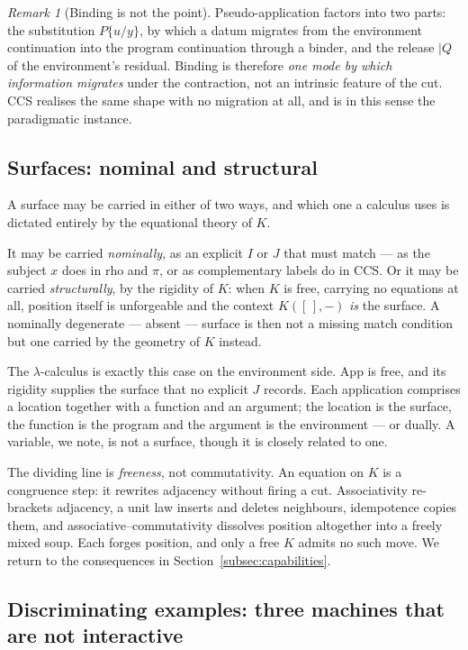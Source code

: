 \documentclass[11pt]{article}
\theoremstyle{definition}
\theoremstyle{plain}
\theoremstyle{remark}
\newtheorem{remark}[definition]{Remark}
\begin{document}
\begin{remark}[Binding is not the point]
Pseudo-application factors into two parts: the substitution $P\{u/y\}$, by which a
datum migrates from the environment continuation into the program continuation through
a binder, and the release $\mid Q$ of the environment's residual. Binding is therefore
\emph{one mode by which information migrates} under the contraction, not an intrinsic
feature of the cut. CCS realises the same shape with no migration at all, and is in this
sense the paradigmatic instance.
\end{remark}

\subsection{Surfaces: nominal and structural}
\label{subsec:surfaces}

A surface may be carried in either of two ways, and which one a calculus uses is
dictated entirely by the equational theory of $K$.

It may be carried \emph{nominally}, as an explicit $I$ or $J$ that must match --- as the
subject $x$ does in rho and $\pi$, or as complementary labels do in CCS. Or it may be
carried \emph{structurally}, by the rigidity of $K$: when $K$ is free, carrying no
equations at all, position itself is unforgeable and the context $K([\,],-)$ \emph{is}
the surface. A nominally degenerate --- absent --- surface is then not a missing match
condition but one carried by the geometry of $K$ instead.

The $\lambda$-calculus is exactly this case on the environment side. $\mathrm{App}$ is
free, and its rigidity supplies the surface that no explicit $J$ records. Each
application comprises a location together with a function and an argument; the location
is the surface, the function is the program and the argument is the environment --- or
dually. A variable, we note, is not a surface, though it is closely related to one.

The dividing line is \emph{freeness}, not commutativity. An equation on $K$ is a
congruence step: it rewrites adjacency without firing a cut. Associativity re-brackets
adjacency, a unit law inserts and deletes neighbours, idempotence copies them, and
associative--commutativity dissolves position altogether into a freely mixed soup. Each
forges position, and only a free $K$ admits no such move. We return to the consequences
in Section~\ref{subsec:capabilities}.

\subsection{Discriminating examples: three machines that are not interactive}
\label{subsec:machines}
\end{document}
